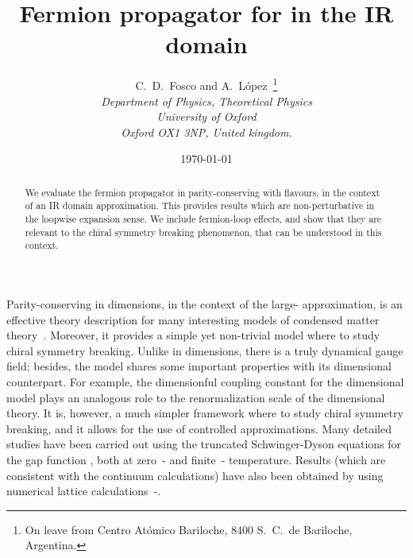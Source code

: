 \documentclass[12pt,a4paper]{article} \usepackage[latin1] {inputenc}
\begin{document}
\title{Fermion propagator for \coordHE{} in the IR domain}
\author{C.~D.~Fosco and A.~L{\'o}pez~\footnote{On leave from Centro
    At\'omico Bariloche, 8400 S.\ C.\ de Bariloche, Argentina.}
  \\
  {\normalsize\it Department of Physics, Theoretical Physics}\\
  {\normalsize\it University of Oxford}\\
  {\normalsize\it Oxford OX1 3NP, United kingdom.} }  \date{\today}
\maketitle
\begin{abstract}
\noindent We evaluate the fermion propagator in parity-conserving
\coordHE{} with \coordHE{} flavours, in the context of an IR domain
approximation. This provides results which are non-perturbative in the
loopwise expansion sense. We include fermion-loop effects, and show
that they are relevant to the chiral symmetry breaking phenomenon,
that can be understood in this context.
\end{abstract}



Parity-conserving \coordHE{} in \coordHE{} dimensions, in the context of the
large-\coordHE{} approximation, is an effective theory description for many
interesting models of condensed matter theory~\cite{qed3}. Moreover,
it provides a simple yet non-trivial model where to study chiral
symmetry breaking. Unlike in \coordHE{} dimensions, there is a truly
dynamical gauge field; besides, the model shares some important
properties with its \coordHE{} dimensional counterpart. For example, the
dimensionful coupling constant for the \coordHE{} dimensional model plays
an analogous role to the renormalization scale of the \coordHE{}
dimensional theory.  It is, however, a much simpler framework where to
study chiral symmetry breaking, and it allows for the use of
controlled approximations.  Many detailed studies have been carried
out using the truncated Schwinger-Dyson equations for the gap function
\myHighlight{$\Sigma$}\coordHE{}, both at zero~\cite{Pisarski:dj}-\cite{Nash:1989xx} and
finite~\cite{Dorey:1991kp}-\cite{Lee:1997xf} temperature.  Results
(which are consistent with the continuum calculations) have also been
obtained by using numerical lattice
calculations~\cite{Dagotto:1988id}-\cite{Hands:2002qt}.
\end{document}
